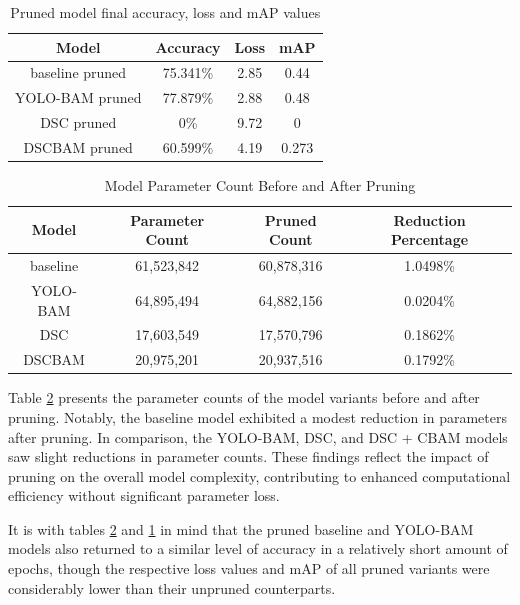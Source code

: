 \begin{table}[!htbp]
    \centering
    \caption{Pruned model final accuracy, loss and mAP values}
    {
    \begin{tabular}{cccc}
        Model & Accuracy & Loss & mAP\\ \hline 
        baseline pruned & 75.341\% & 2.85 & 0.44\\ 
        \hline 
        YOLO-BAM pruned & 77.879\% & 2.88 & 0.48\\ 
        \hline 
        DSC pruned & 0\% & 9.72 & 0\\ 
        \hline 
        DSCBAM pruned & 60.599\% & 4.19 & 0.273\\
        \hline
    \end{tabular}
    }
    \label{tab:prunedmodelperfs}
\end{table}

\begin{table}[!htbp]
    \centering
    \caption{Model Parameter Count Before and After Pruning}
    \resizebox{0.95\linewidth}{!}
    {
    \begin{tabular}{cccc}
          Model& Parameter Count & Pruned Count & Reduction Percentage\\
          \hline
          baseline & 61,523,842 & 60,878,316 & 1.0498\% \\
          \hline
          YOLO-BAM & 64,895,494 & 64,882,156 & 0.0204\% \\
          \hline
          DSC & 17,603,549 & 17,570,796 & 0.1862\% \\
          \hline
          DSCBAM & 20,975,201 & 20,937,516 & 0.1792\% \\
          \hline
    \end{tabular}
    }
    \label{tab:modelparaprunes}
\end{table}

Table \ref{tab:modelparaprunes} presents the parameter counts of the model variants before and after pruning. Notably, the baseline model exhibited a modest reduction in parameters after pruning. In comparison, the YOLO-BAM, DSC, and DSC + CBAM models saw slight reductions in parameter counts. These findings reflect the impact of pruning on the overall model complexity, contributing to enhanced computational efficiency without significant parameter loss.

It is with tables \ref{tab:modelparaprunes} and \ref{tab:prunedmodelperfs} in mind that the pruned baseline and YOLO-BAM models also returned to a similar level of accuracy in a relatively short amount of epochs, though the respective loss values and mAP of all pruned variants were considerably lower than their unpruned counterparts. 


